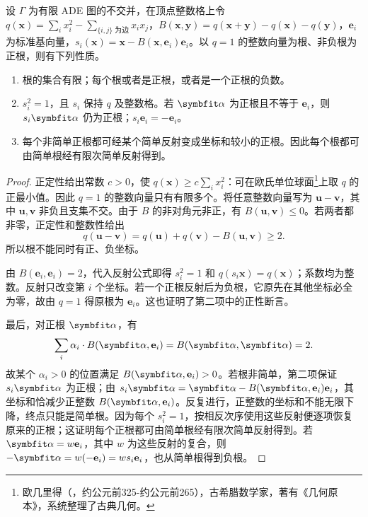 \begin{lemma}\label{b5:lem:positive-root-reflection}
	设 \(\Gamma\) 为有限 ADE 图的不交并，在顶点整数格上令 \(q(\mathbf x)=\sum_i x_i^2-\sum_{\{i,j\}\text{ 为边}}x_ix_j\)，\(B(\mathbf x,\mathbf y)=q(\mathbf x+\mathbf y)-q(\mathbf x)-q(\mathbf y)\)，\(\mathbf e_i\) 为标准基向量，\(s_i(\mathbf x)=\mathbf x-B(\mathbf x,\mathbf e_i)\mathbf e_i\)。以 \(q=1\) 的整数向量为根、非负根为正根，则有下列性质。
	\begin{enumerate}
		\item 根的集合有限；每个根或者是正根，或者是一个正根的负数。
		\item \(s_i^2=1\)，且 \(s_i\) 保持 \(q\) 及整数格。若 \(\symbfit\alpha\) 为正根且不等于 \(\mathbf e_i\)，则 \(s_i\symbfit\alpha\) 仍为正根；\(s_i\mathbf e_i=-\mathbf e_i\)。
		\item 每个非简单正根都可经某个简单反射变成坐标和较小的正根。因此每个根都可由简单根经有限次简单反射得到。
	\end{enumerate}
\end{lemma}
\begin{proof}
	正定性给出常数 \(c>0\)，使 \(q(\mathbf x)\geq c\sum_i x_i^2\)：可在欧氏单位球面\footnote{欧几里得（，约公元前325-约公元前265），古希腊数学家，著有《几何原本》，系统整理了古典几何。}上取 \(q\) 的正最小值。因此 \(q=1\) 的整数向量只有有限多个。将任意整数向量写为 \(\mathbf u-\mathbf v\)，其中 \(\mathbf u,\mathbf v\) 非负且支集不交。由于 \(B\) 的非对角元非正，有 \(B(\mathbf u,\mathbf v)\leq0\)。若两者都非零，正定性和整数性给出
	\[
		q(\mathbf u-\mathbf v)=q(\mathbf u)+q(\mathbf v)-B(\mathbf u,\mathbf v)\geq2.
	\]
	所以根不能同时有正、负坐标。

	由 \(B(\mathbf e_i,\mathbf e_i)=2\)，代入反射公式即得 \(s_i^2=1\) 和 \(q(s_i\mathbf x)=q(\mathbf x)\)；系数均为整数。反射只改变第 \(i\) 个坐标。若一个正根反射后为负根，它原先在其他坐标必全为零，故由 \(q=1\) 得原根为 \(\mathbf e_i\)。这也证明了第二项中的正性断言。

	最后，对正根 \(\symbfit\alpha\)，有
	\[
		\sum_i\alpha_i\cdot B(\symbfit\alpha,\mathbf e_i) =B(\symbfit\alpha,\symbfit\alpha)=2.
	\]
	故某个 \(\alpha_i>0\) 的位置满足 \(B(\symbfit\alpha,\mathbf e_i)>0\)。若根非简单，第二项保证 \(s_i\symbfit\alpha\) 为正根；由 \(s_i\symbfit\alpha=\symbfit\alpha-B(\symbfit\alpha,\mathbf e_i)\mathbf e_i\)，其坐标和恰减少正整数 \(B(\symbfit\alpha,\mathbf e_i)\)。反复进行，正整数的坐标和不能无限下降，终点只能是简单根。因为每个 \(s_i^2=1\)，按相反次序使用这些反射便逐项恢复原来的正根；这证明每个正根都可由简单根经有限次简单反射得到。若 \(\symbfit\alpha=w\mathbf e_i\)，其中 \(w\) 为这些反射的复合，则 \(-\symbfit\alpha=w(-\mathbf e_i)=ws_i\mathbf e_i\)，也从简单根得到负根。
\end{proof}

